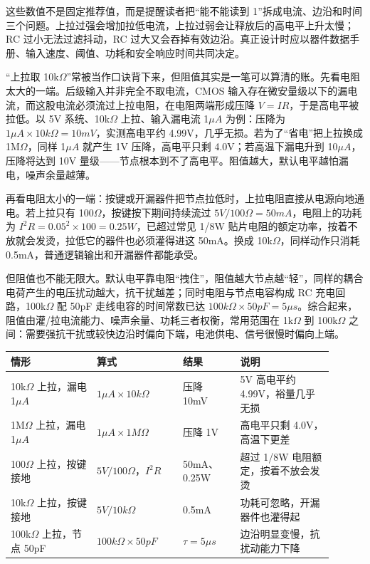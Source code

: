 这些数值不是固定推荐值，而是提醒读者把“能不能读到 1”拆成电流、边沿和时间三个问题。上拉过强会增加拉低电流，上拉过弱会让释放后的高电平上升太慢；RC 过小无法过滤抖动，RC 过大又会吞掉有效边沿。真正设计时应以器件数据手册、输入速度、阈值、功耗和安全响应时间共同决定。

“上拉取 10k$\Omega$”常被当作口诀背下来，但阻值其实是一笔可以算清的账。先看电阻太大的一端。后级输入并非完全不取电流，CMOS 输入存在微安量级以下的漏电流，而这股电流必须流过上拉电阻，在电阻两端形成压降 $V=IR$，于是高电平被拉低。以 5V 系统、10k$\Omega$ 上拉、输入漏电流 1$\mu A$ 为例：压降为 $1\mu A \times 10k\Omega = 10mV$，实测高电平约 4.99V，几乎无损。若为了“省电”把上拉换成 1M$\Omega$，同样 1$\mu A$ 就产生 1V 压降，高电平只剩 4.0V；若高温下漏电升到 10$\mu A$，压降将达到 10V 量级——节点根本到不了高电平。阻值越大，默认电平越怕漏电，噪声余量越薄。

再看电阻太小的一端：按键或开漏器件把节点拉低时，上拉电阻直接从电源向地通电。若上拉只有 100$\Omega$，按键按下期间持续流过 $5V/100\Omega = 50mA$，电阻上的功耗为 $I^2R = 0.05^2 \times 100 = 0.25W$，已超过常见 1/8W 贴片电阻的额定功率，按着不放就会发烫，拉低它的器件也必须灌得进这 50mA。换成 10k$\Omega$，同样动作只消耗 0.5mA，普通逻辑输出和开漏器件都能承受。

但阻值也不能无限大。默认电平靠电阻“拽住”，阻值越大节点越“轻”，同样的耦合电荷产生的电压扰动越大，抗干扰越差；同时电阻与节点电容构成 RC 充电回路，100k$\Omega$ 配 50pF 走线电容的时间常数已达 $100k\Omega \times 50pF = 5\mu s$。综合起来，阻值由灌/拉电流能力、噪声余量、功耗三者权衡，常用范围在 1k$\Omega$ 到 100k$\Omega$ 之间：需要强抗干扰或较快边沿时偏向下端，电池供电、信号很慢时偏向上端。

\begin{longtable}{L{0.24\linewidth}L{0.24\linewidth}L{0.16\linewidth}L{0.26\linewidth}}
\toprule
情形 & 算式 & 结果 & 说明 \\
\midrule
10k$\Omega$ 上拉，漏电 1$\mu A$ & $1\mu A \times 10k\Omega$ & 压降 10mV & 5V 高电平约 4.99V，裕量几乎无损 \\
1M$\Omega$ 上拉，漏电 1$\mu A$ & $1\mu A \times 1M\Omega$ & 压降 1V & 高电平只剩 4.0V，高温下更差 \\
100$\Omega$ 上拉，按键接地 & $5V/100\Omega$，$I^2R$ & 50mA、0.25W & 超过 1/8W 电阻额定，按着不放会发烫 \\
10k$\Omega$ 上拉，按键接地 & $5V/10k\Omega$ & 0.5mA & 功耗可忽略，开漏器件也灌得起 \\
100k$\Omega$ 上拉，节点 50pF & $100k\Omega \times 50pF$ & $\tau = 5\mu s$ & 边沿明显变慢，抗扰动能力下降 \\
\bottomrule
\end{longtable}

